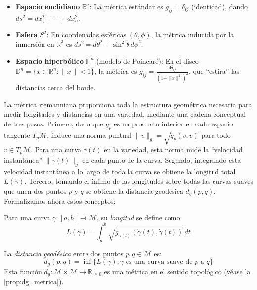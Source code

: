 \begin{example}\label{ex:metricas_variedades}
\leavevmode
\begin{itemize}
	\item \textbf{Espacio euclidiano} $\mathbb{R}^n$: La métrica estándar es $g_{ij} = \delta_{ij}$ (identidad), dando $ds^2 = dx_1^2 + \cdots + dx_n^2$.

	\item \textbf{Esfera} $S^2$: En coordenadas esféricas $(\theta, \phi)$, la métrica inducida por la inmersión en $\mathbb{R}^3$ es $ds^2 = d\theta^2 + \sin^2\theta \, d\phi^2$.

	\item \textbf{Espacio hiperbólico} $\mathbb{H}^n$ (modelo de Poincaré): En el disco $\mathbb{D}^n = \{x \in \mathbb{R}^n : \|x\| < 1\}$, la métrica es $g_{ij} = \frac{4\delta_{ij}}{(1-\|x\|^2)^2}$, que ``estira'' las distancias cerca del borde.
\end{itemize}
\end{example}

La métrica riemanniana proporciona toda la estructura geométrica necesaria para medir longitudes y distancias en una variedad, mediante una cadena conceptual de tres pasos. Primero, dado que $g_p$ es un producto interior en cada espacio tangente $T_p\mathcal{M}$, induce una norma puntual $\|v\|_g = \sqrt{g_p(v,v)}$ para todo $v \in T_p\mathcal{M}$. Para una curva $\gamma(t)$ en la variedad, esta norma mide la ``velocidad instantánea'' $\|\dot\gamma(t)\|_g$ en cada punto de la curva. Segundo, integrando esta velocidad instantánea a lo largo de toda la curva se obtiene la longitud total $L(\gamma)$. Tercero, tomando el ínfimo de las longitudes sobre todas las curvas suaves que unen dos puntos $p$ y $q$ se obtiene la distancia geodésica $d_g(p,q)$. Formalizamos ahora estos conceptos:

\begin{definition}\label{def:longitud_curvas}
Para una curva $\gamma: [a,b] \to \mathcal{M}$, su \textit{longitud} se define como:
\[
L(\gamma) = \int_a^b \sqrt{g_{\gamma(t)}(\dot{\gamma}(t), \dot{\gamma}(t))} \, dt
\]
\end{definition}

\begin{definition}\label{def:distancia_geodesica}
La \textit{distancia geodésica} entre dos puntos $p, q \in \mathcal{M}$ es:
\[
d_g(p,q) = \inf\{L(\gamma) : \gamma \text{ es una curva suave de } p \text{ a } q\}
\]
Esta función $d_g: \mathcal{M} \times \mathcal{M} \to \mathbb{R}_{\geq 0}$ es una métrica en el sentido topológico (véase la \autoref{prop:dg_metrica}).
\end{definition}

